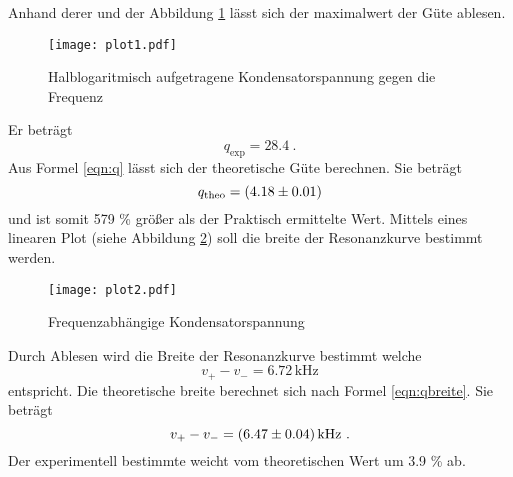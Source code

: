 Anhand derer und der Abbildung \ref{fig:logUc} lässt sich der maximalwert der Güte ablesen. 
\begin{figure}
  \centering
  \texttt{[image: plot1.pdf]}
  \caption{Halblogaritmisch aufgetragene Kondensatorspannung gegen die Frequenz}
  \label{fig:logUc}
\end{figure}
Er beträgt
\begin{equation}
  q_\text{exp} = 28.4 \ .
  \label{eqn:qexp}
\end{equation}
Aus Formel \ref{eqn:q} lässt sich der theoretische Güte berechnen. Sie beträgt 
\begin{equation}
  q_\text{theo} = (\num{4.18 +- 0.01})
  \label{eqn:qtheo}
\end{equation} 
und ist somit 579 \% größer als der Praktisch ermittelte Wert. Mittels eines linearen Plot (siehe Abbildung \ref{fig:fUc}) soll die breite der Resonanzkurve bestimmt werden.
\begin{figure}
  \centering
  \texttt{[image: plot2.pdf]}
  \caption{Frequenzabhängige Kondensatorspannung}
  \label{fig:fUc}
\end{figure}
Durch Ablesen wird die Breite der Resonanzkurve bestimmt welche 
\begin{equation}
  v_+ - v_- = 6.72 \, \text{kHz} 
\end{equation}
entspricht. Die theoretische breite berechnet sich nach Formel \ref{eqn:qbreite}. Sie beträgt
\begin{equation}
v_+ - v_- = (\num{6.47 +- 0.04}) \, \text{kHz} \ .
\end{equation}
Der experimentell bestimmte weicht vom theoretischen Wert um 3.9 \% ab.
